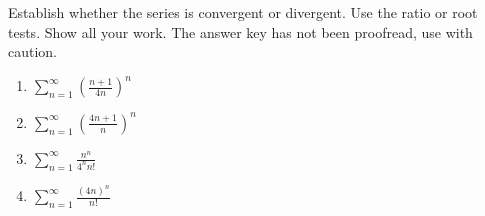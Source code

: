 Establish whether the series is convergent or divergent. Use the ratio or root tests. Show all your work. The answer key has not been proofread, use with caution.
\begin{enumerate}
\item $\displaystyle \sum\limits_{n=1}^{\infty}\left(\frac{n+1 }{4n}\right)^n$
\item $\displaystyle \sum\limits_{n=1}^{\infty}\left(\frac{4n+1 }{n}\right)^n$
\item $\displaystyle \sum\limits_{n=1}^{\infty} \frac{n^n }{4^n n!}$
\item $\displaystyle \sum\limits_{n=1}^{\infty} \frac{(4n)^n }{ n!}$
\end{enumerate}